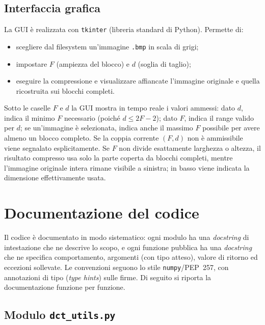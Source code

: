 \documentclass[11pt,a4paper]{article}
\begin{document}
\subsection{Interfaccia grafica}\label{sec:gui}

La GUI è realizzata con \texttt{tkinter} (libreria standard di Python). Permette
di:
\begin{itemize}
  \item scegliere dal filesystem un'immagine \texttt{.bmp} in scala di grigi;
  \item impostare $F$ (ampiezza del blocco) e $d$ (soglia di taglio);
  \item eseguire la compressione e visualizzare affiancate l'immagine originale
        e quella ricostruita sui blocchi completi.
\end{itemize}
Sotto le caselle $F$ e $d$ la GUI mostra in tempo reale i valori ammessi:
dato $d$, indica il minimo $F$ necessario (poiché $d\le 2F-2$); dato $F$,
indica il range valido per $d$; se un'immagine è selezionata, indica anche il
massimo $F$ possibile per avere almeno un blocco completo. Se la coppia
corrente $(F,d)$ non è ammissibile viene segnalato esplicitamente. Se $F$ non
divide esattamente larghezza o altezza, il risultato compresso usa solo la
parte coperta da blocchi completi, mentre l'immagine originale intera rimane
visibile a sinistra; in basso viene indicata la dimensione effettivamente usata.

\section{Documentazione del codice}\label{sec:documentazione}

Il codice è documentato in modo sistematico: ogni modulo ha una \emph{docstring}
di intestazione che ne descrive lo scopo, e ogni funzione pubblica ha una
\emph{docstring} che ne specifica comportamento, argomenti (con tipo atteso),
valore di ritorno ed eccezioni sollevate. Le convenzioni seguono lo stile
\texttt{numpy}/PEP~257, con annotazioni di tipo (\emph{type hints}) sulle
firme. Di seguito si riporta la documentazione funzione per funzione.

\subsection{Modulo \texttt{dct\_utils.py}}
\end{document}
